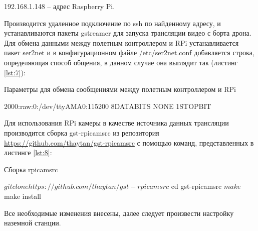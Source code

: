 192.168.1.148 -- адрес Raspberry Pi.

Производится удаленное подключение по ssh по найденному адресу, и устанавливаются пакеты gstreamer для запуска трансляции видео с борта дрона.
Для обмена данными между полетным контроллером и RPi устанавливается пакет ser2net и в конфигурационном файле /etc/ser2net.conf добавляется строка, определяющая способ общения, в данном случае она выглядит так (листинг \ref{lst:7}):
\begin{Program}[H]
\caption{Параметры для обмена сообщениями между полетным контроллером и RPi} \label{lst:7}
	\begin{MyCode}
	2000:raw:0:/dev/ttyAMA0:115200 8DATABITS NONE 1STOPBIT
	\end{MyCode}
\end{Program}

Для использования RPi камеры в качестве источника данных трансляции производится сборка gst-rpicamsrc из репозитория \url{https://github.com/thaytan/gst-rpicamsrc} с помощью команд, представленных в листинге \ref{lst:8}:
\begin{Program}[H]
\caption{Сборка rpicamsrc} \label{lst:8}
	\begin{MyCode}
	$ git clone https://github.com/thaytan/gst-rpicamsrc
	$ cd gst-rpicamsrc
	$ make
	$ make install
	\end{MyCode}
\end{Program}

Все необходимые изменения внесены, далее следует произвести настройку наземной станции.

